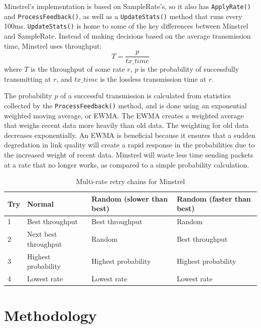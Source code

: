 \documentclass[letterpaper,twocolumn,10pt]{article}
\begin{document}
Minstrel's implementation is based on SampleRate's, so it also has \texttt{ApplyRate()} and \texttt{ProcessFeedback()}, as well as a \texttt{UpdateStats()} method that runs every 100ms. \texttt{UpdateStats()} is home to some of the key differences between Minstrel and SampleRate. Instead of making decisions based on the average 
transmission time, Minstrel uses throughput: \begin{equation} T = \frac{p}{tx\_time}\end{equation} where $T$ is the throughput of some rate $r$, $p$ is the probability of successfully transmitting at $r$, and $tx\_time$ is the lossless transmission time at $r$.

The probability $p$ of a successful transmission is calculated from statistics collected by the \texttt{ProcessFeedback()} method, and is done using an exponential weighted moving average, or EWMA. The EWMA creates a weighted average that weighs recent data more heavily than old data. The weighting for old data decreases exponentially. An EWMA is beneficial because it ensures that a sudden degredation in link quality will create a rapid response in the probabilities due to the increased weight of recent data. Minstrel will waste less time sending packets at a rate that no longer works, as compared to a simple probability calculation.

\begin{table}[htb]
  \centering
    \begin{tabular}[htb]{l|l|l|l}
    \textbf{Try} & \textbf{Normal}               & \textbf{Random (slower than best)} & \textbf{Random (faster than best)} \\ \hline
    1   & Best throughput      & Best throughput           & Random                    \\
    2   & Next best throughput & Random                    & Best throughput           \\
    3   & Highest probability  & Highest probability       & Highest probability       \\
    4   & Lowest rate          & Lowest rate               & Lowest rate               \\
    \end{tabular}
    \caption{Multi-rate retry chains for Minstrel}
\label{table:1}
\end{table}

\section{Methodology}
\end{document}
